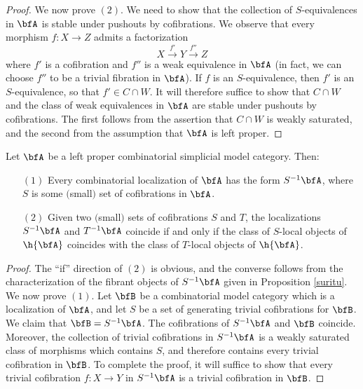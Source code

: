 \begin{Simplicial Categories}
\begin{proof}
We now prove $(2)$. We need to show that the collection of $S$-equivalences in $\bfA$ is stable under pushouts by cofibrations. We observe that every morphism $f: X \rightarrow Z$ admits a factorization 
$$ X \stackrel{f'}{\rightarrow} Y \stackrel{f''}{\rightarrow} Z$$
where $f'$ is a cofibration and $f''$ is a weak equivalence in $\bfA$ (in fact, we can choose $f''$ to be a trivial fibration in $\bfA$). If $f$ is an $S$-equivalence, then $f'$ is an $S$-equivalence, so that $f' \in C \cap W$. It will therefore suffice to show that $C \cap W$ and the class of weak equivalences in $\bfA$ are stable under pushouts by cofibrations. The first follows from the assertion that $C \cap W$ is weakly saturated, and the second from the assumption that $\bfA$ is left proper.
\end{proof}

\begin{proposition}\label{surito}
Let $\bfA$ be a left proper combinatorial simplicial model category. Then:
\begin{itemize}
\item[$(1)$] Every combinatorial localization of $\bfA$ has the form $S^{-1} \bfA$, where
$S$ is some $($small$)$ set of cofibrations in $\bfA$.
\item[$(2)$] Given two $($small$)$ sets of cofibrations $S$ and $T$, the localizations
$S^{-1} \bfA$ and $T^{-1} \bfA$ coincide if and only if the class of $S$-local objects of
$\h{\bfA}$ coincides with the class of $T$-local objects of $\h{\bfA}$.
\end{itemize}
\end{proposition}

\begin{proof}
The ``if'' direction of $(2)$ is obvious, and the converse follows from the characterization of the fibrant objects of $S^{-1} \bfA$ given in Proposition \ref{suritu}. We now prove $(1)$. Let $\bfB$ be a combinatorial model category which is a localization of $\bfA$, and let $S$ be a set of generating trivial cofibrations for $\bfB$. We claim that $\bfB = S^{-1} \bfA$. The cofibrations of $S^{-1} \bfA$ and $\bfB$ coincide. Moreover, the collection of trivial cofibrations in $S^{-1} \bfA$ is a weakly saturated class of morphisms which contains $S$, and therefore contains every trivial cofibration in $\bfB$. To complete the proof, it will suffice to show that every trivial cofibration $f: X \rightarrow Y$ in $S^{-1} \bfA$ is a trivial cofibration in $\bfB$.


\end{proof}
\end{Simplicial Categories}
